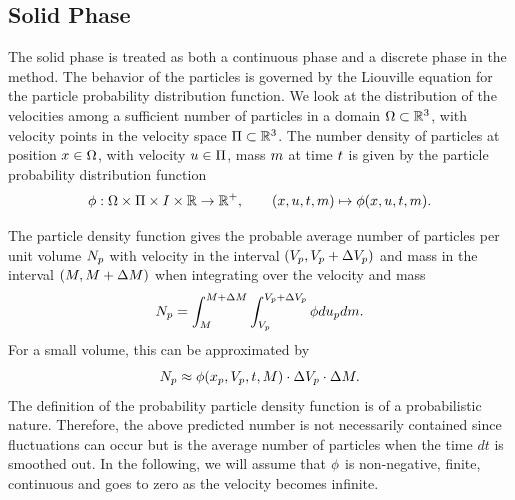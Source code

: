 \subsection{Solid Phase}
The solid phase is treated as both a continuous phase and a discrete phase in the \MP method.
The behavior of the particles is governed by the Liouville equation for the particle probability distribution function.
We look at the distribution of the velocities among a sufficient number of particles in a domain $\Omega \subset \mathbb{R}^3$, with velocity points in the velocity space $\Pi \subset \mathbb{R}^3$. 
The number density of particles at position $x \in \Omega$, with velocity $u \in \Pi$, mass $m$ at time $t$ is given by the particle probability distribution function
\begin{equation}
    \phi : \Omega \times \Pi \times I \times \mathbb{R} \to \mathbb{R}^+, \qquad (x, u, t, m) \mapsto \phi (x , u , t, m).  
\end{equation}



The particle density function gives the probable average number of particles per unit volume $N_p$ with velocity in the interval $(V_p, V_p + \Delta V_p)$ and mass in the interval $(M, M + \Delta M)$ when integrating over the velocity and mass
\begin{equation}
    N_p = \int_{M}^{M+\Delta M} \int_{V_p}^{V_p + \Delta V_p} \phi d u_p d m. 
\end{equation} 
For a small volume, this can be approximated by
\begin{equation}
    N_p \approx \phi (x_p , V_p , t, M) \cdot \Delta V_p \cdot \Delta M.
\end{equation}
The definition of the probability particle density function is of a probabilistic nature.
Therefore, the above predicted number is not necessarily contained since fluctuations can occur but is the average number of particles when the time $dt$ is smoothed out.
In the following, we will assume that $\phi$ is non-negative, finite, continuous and goes to zero as the velocity becomes infinite.

